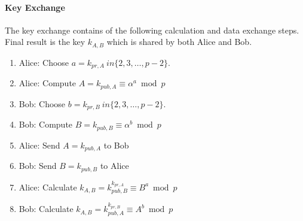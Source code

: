 \paragraph{Key Exchange}

The key exchange contains of the following calculation and data exchange steps. Final result is the key $k_{A,B}$ which is shared by both Alice and Bob.

\begin{enumerate}
	\item Alice: Choose $a = k_{pr, A} \ in \{2,3,\ldots, p-2\}$.
	\item Alice: Compute $A = k_{pub, A} \equiv \alpha^a \bmod p$
	\item Bob: Choose $b = k_{pr, B} \ in \{2,3,\ldots, p-2\}$.
	\item Bob: Compute $B = k_{pub, B} \equiv \alpha^b \bmod p$
	\item Alice: Send $A = k_{pub, A}$ to Bob
	\item Bob: Send $B = k_{pub, B}$ to Alice
	\item Alice: Calculate $k_{A,B} = k_{pub, B}^{k_{pr, A}} \equiv B^a \bmod p$
	\item Bob: Calculate $k_{A,B} = k_{pub, A}^{k_{pr, B}} \equiv A^b \bmod p$
\end{enumerate}


